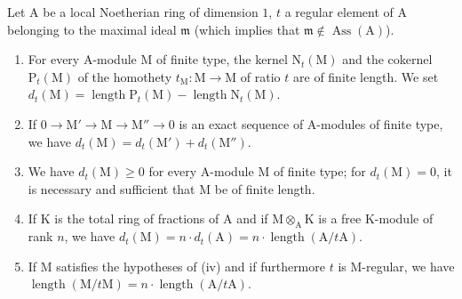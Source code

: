 \begin{lemma}[21.10.13]
\label{IV.21.10.13}
Let $\mathrm{A}$ be a local Noetherian ring of dimension $1$, $t$ a regular element of $\mathrm{A}$ belonging to the maximal ideal $\mathfrak{m}$ (which implies that $\mathfrak{m}\notin\operatorname{Ass}(\mathrm{A})$).
\begin{enumerate}[label=(\roman*)]
  \item For every A-module $\mathrm{M}$ of finite type, the kernel $\mathrm{N}_t(\mathrm{M})$ and the cokernel $\mathrm{P}_t(\mathrm{M})$ of the homothety $t_{\mathrm{M}}:\mathrm{M}\to\mathrm{M}$ of ratio $t$ are of finite length. We set $d_t(\mathrm{M})=\operatorname{length}\mathrm{P}_t(\mathrm{M})-\operatorname{length}\mathrm{N}_t(\mathrm{M})$.
  \item If $0\to\mathrm{M}'\to\mathrm{M}\to\mathrm{M}''\to 0$ is an exact sequence of A-modules of finite type, we have $d_t(\mathrm{M})=d_t(\mathrm{M}')+d_t(\mathrm{M}'')$.
  \item We have $d_t(\mathrm{M})\geq 0$ for every A-module $\mathrm{M}$ of finite type; for $d_t(\mathrm{M})=0$, it is necessary and sufficient that $\mathrm{M}$ be of finite length.
  \item If $\mathrm{K}$ is the total ring of fractions of $\mathrm{A}$ and if $\mathrm{M}\otimes_{\mathrm{A}}\mathrm{K}$ is a free $\mathrm{K}$-module of rank $n$, we have $d_t(\mathrm{M})=n\cdot d_t(\mathrm{A})=n\cdot\operatorname{length}(\mathrm{A}/t\mathrm{A})$.
  \item If $\mathrm{M}$ satisfies the hypotheses of (iv) and if furthermore $t$ is $\mathrm{M}$-regular, we have $\operatorname{length}(\mathrm{M}/t\mathrm{M})=n\cdot\operatorname{length}(\mathrm{A}/t\mathrm{A})$.
\end{enumerate}
\end{lemma}

